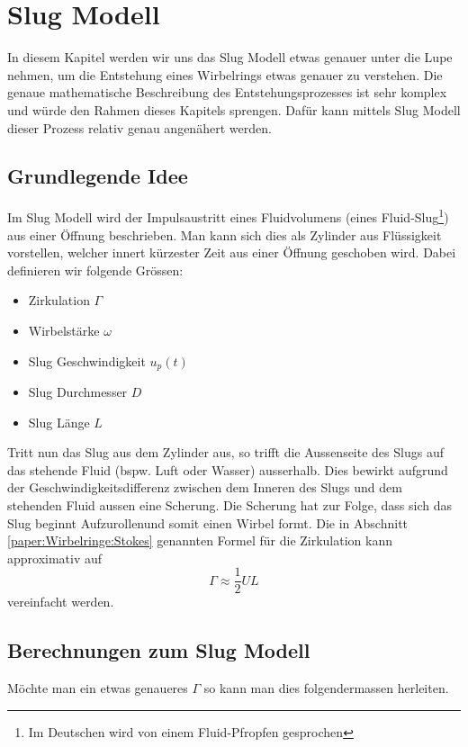 %
%
%
\section{Slug Modell}
In diesem Kapitel werden wir uns das Slug Modell etwas genauer unter die Lupe nehmen, um die Entstehung eines Wirbelrings etwas genauer zu verstehen.
Die genaue mathematische Beschreibung des Entstehungsprozesses ist sehr komplex und würde den Rahmen dieses Kapitels sprengen.
Dafür kann mittels Slug Modell dieser Prozess relativ genau angenähert werden.

\subsection{Grundlegende Idee}
Im Slug Modell wird der Impulsaustritt eines Fluidvolumens (eines Fluid-Slug\footnote{Im Deutschen wird von einem Fluid-Pfropfen gesprochen}) aus einer Öffnung beschrieben.
Man kann sich dies als Zylinder aus Flüssigkeit vorstellen, welcher innert kürzester Zeit aus einer Öffnung geschoben wird.
Dabei definieren wir folgende Grössen:
\begin{itemize}
    \item Zirkulation $\Gamma$
    \item Wirbelstärke $\omega$
    \item Slug Geschwindigkeit $u_p(t)$
    \item Slug Durchmesser $D$
    \item Slug Länge $L$
\end{itemize}
Tritt nun das Slug aus dem Zylinder aus, so trifft die Aussenseite des Slugs auf das stehende Fluid (bspw. Luft oder Wasser) ausserhalb.
Dies bewirkt aufgrund der Geschwindigkeitsdifferenz zwischen dem Inneren des Slugs und dem stehenden Fluid aussen eine Scherung.
Die Scherung hat zur Folge, dass sich das Slug beginnt \glqq Aufzurollen\grqq und somit einen Wirbel formt. 
Die in Abschnitt \ref{paper:Wirbelringe:Stokes} genannten Formel für die Zirkulation kann approximativ auf
\[
\Gamma \approx \frac{1}{2}UL
\]
vereinfacht werden.

\subsection{Berechnungen zum Slug Modell}
Möchte man ein etwas genaueres $\Gamma$ so kann man dies folgendermassen herleiten.


